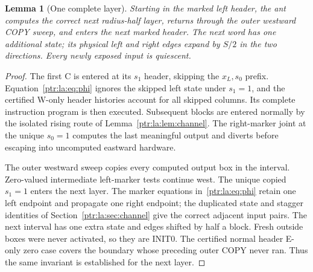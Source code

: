 \documentclass[11pt,letterpaper]{article}
\newtheorem{lemma}[theorem]{Lemma}
\theoremstyle{definition}\newtheorem{definition}[theorem]{Definition}
\theoremstyle{remark}\newtheorem{remark}[theorem]{Remark}
\begin{document}
\begin{lemma}[One complete layer]\label{ptr:la:lem:layer}
Starting in the marked left header, the ant computes the correct next radius-half layer, returns through the outer westward COPY sweep, and enters the next marked header. The next word has one additional state; its physical left and right edges expand by $S/2$ in the two directions. Every newly exposed input is quiescent.
\end{lemma}
\begin{proof}
The first C is entered at its $s_1$ header, skipping the $x_L,s_0$ prefix. Equation~\eqref{ptr:la:eq:phi} ignores the skipped left state under $s_1=1$, and the certified W-only header histories account for all skipped columns. Its complete instruction program is then executed. Subsequent blocks are entered normally by the isolated rising route of Lemma~\ref{ptr:la:lem:channel}. The right-marker joint at the unique $s_0=1$ computes the last meaningful output and diverts before escaping into uncomputed eastward hardware.

The outer westward sweep copies every computed output box in the interval. Zero-valued intermediate left-marker tests continue west. The unique copied $s_1=1$ enters the next layer. The marker equations in~\eqref{ptr:la:eq:phi} retain one left endpoint and propagate one right endpoint; the duplicated state and stagger identities of Section~\ref{ptr:la:sec:channel} give the correct adjacent input pairs. The next interval has one extra state and edges shifted by half a block. Fresh outside boxes were never activated, so they are INIT0. The certified normal header E-only zero case covers the boundary whose preceding outer COPY never ran. Thus the same invariant is established for the next layer.
\end{proof}
\end{document}
